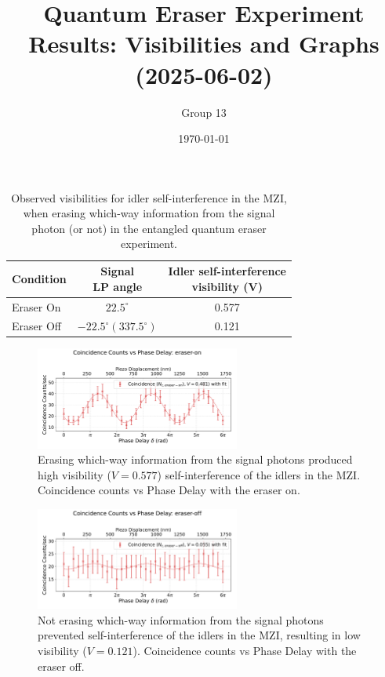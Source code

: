 \documentclass{article}
\title{Quantum Eraser Experiment Results: Visibilities and Graphs (2025-06-02)}
\author{Group 13} %
\date{\today}
\begin{document}
\pagestyle{empty} %

%

\begin{table}[h!]
\centering
\begin{tabular}{lcc}
\toprule
Condition & \makecell{Signal \\ LP angle} & \makecell{Idler self-interference \\ visibility (V)} \\
\midrule
Eraser On          & $22.5^\circ$  & 0.577 \\
Eraser Off         & $-22.5^\circ (337.5^\circ)$ & 0.121 \\
\bottomrule
\end{tabular}
\caption{
  Observed visibilities for idler self-interference in the MZI,
  when erasing which-way information from the signal photon (or not)
  in the entangled quantum eraser experiment.}
\end{table}


\begin{figure}[h!]
\centering
\includegraphics[width=0.6\textwidth]{coincidence_counts_eraser_on.pdf}
\caption{
  Erasing which-way information from the signal photons
  produced high visibility ($V=0.577$) self-interference of the idlers in the MZI.
  Coincidence counts vs Phase Delay with the eraser on.
}
\end{figure}


\begin{figure}[h!]
\centering
\includegraphics[width=0.6\textwidth]{coincidence_counts_eraser_off.pdf}
\caption{
  Not erasing which-way information from the signal photons
  prevented self-interference of the idlers in the MZI,
  resulting in low visibility ($V=0.121$).
  Coincidence counts vs Phase Delay with the eraser off.
}
\end{figure}
\end{document}
